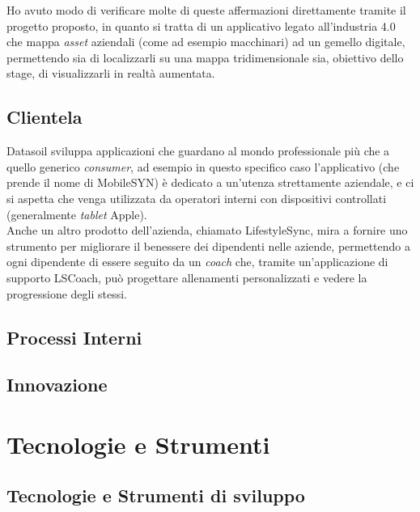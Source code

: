 Ho avuto modo di verificare molte di queste affermazioni direttamente tramite il progetto proposto, in quanto si tratta di un applicativo legato all'industria 4.0 che mappa \textit{asset} aziendali (come ad esempio macchinari) ad un gemello digitale, permettendo sia di localizzarli su una mappa tridimensionale sia, obiettivo dello stage, di visualizzarli in realtà aumentata.\\

\subsection{Clientela}
Datasoil sviluppa applicazioni che guardano al mondo professionale più che a quello generico \textit{consumer}, ad esempio in questo specifico caso l'applicativo (che prende il nome di MobileSYN) è dedicato a un'utenza strettamente aziendale, e ci si aspetta che venga utilizzata da operatori interni con dispositivi controllati (generalmente \textit{tablet} Apple). \\
Anche un altro prodotto dell'azienda, chiamato LifestyleSync, mira a fornire uno strumento per migliorare il benessere dei dipendenti nelle aziende, permettendo a ogni dipendente di essere seguito da un \textit{coach} che, tramite un'applicazione di supporto LSCoach, può progettare allenamenti personalizzati e vedere la progressione degli stessi.

\subsection{Processi Interni}

\subsection{Innovazione}
\section{Tecnologie e Strumenti}
\label{sec:tecnologie-e-strumenti}

\subsection{Tecnologie e Strumenti di sviluppo}
